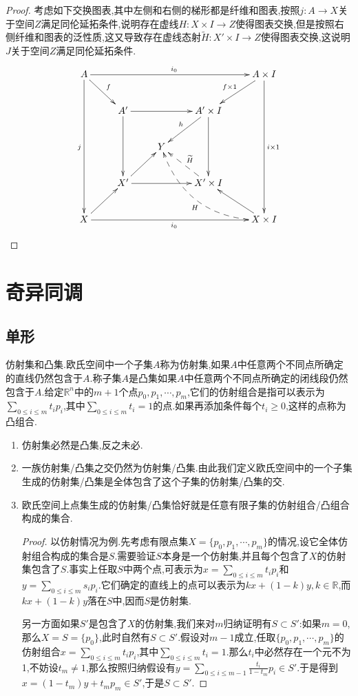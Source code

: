 \begin{enumerate}
\begin{proof}
    	考虑如下交换图表,其中左侧和右侧的梯形都是纤维和图表,按照$j:A\to X$关于空间$Z$满足同伦延拓条件,说明存在虚线$H:X\times I\to Z$使得图表交换,但是按照右侧纤维和图表的泛性质,这又导致存在虚线态射$\widetilde{H}:X'\times I\to Z$使得图表交换,这说明$J$关于空间$Z$满足同伦延拓条件.
    	$$\xymatrix{A\ar[rrrr]^{i_0}\ar[dddd]_j\ar[dr]^f&&&&A\times I\ar[dddd]^{i\times1}\ar[dl]_{f\times1}\\&A'\ar[rr]\ar[dd]&&A'\times I\ar[dd]\ar[dl]_h&\\&&Y&&\\&X'\ar[rr]\ar[ur]&&X'\times I\ar@{-->}[ul]_{\widetilde{H}}&\\X\ar[ur]\ar[rrrr]_{i_0}&&&&X\times I\ar[ul]\ar@/^2pc/@{-->}[uull]^{H}}$$
    \end{proof}
\end{enumerate}








\newpage
\section{奇异同调}
\subsection{单形}
	
仿射集和凸集.欧氏空间中一个子集$A$称为仿射集,如果$A$中任意两个不同点所确定的直线仍然包含于$A$.称子集$A$是凸集如果$A$中任意两个不同点所确定的闭线段仍然包含于$A$.给定$\mathbb{R}^n$中的$m+1$个点$p_0,p_1,\cdots,p_m$,它们的仿射组合是指可以表示为$\sum_{0\le i\le m}t_ip_i$,其中$\sum_{0\le i\le m}t_i=1$的点.如果再添加条件每个$t_i\ge0$,这样的点称为凸组合.
\begin{enumerate}
	\item 仿射集必然是凸集,反之未必.
	\item 一族仿射集/凸集之交仍然为仿射集/凸集.由此我们定义欧氏空间中的一个子集生成的仿射集/凸集是全体包含了这个子集的仿射集/凸集的交.
	\item 欧氏空间上点集生成的仿射集/凸集恰好就是任意有限子集的仿射组合/凸组合构成的集合.
	\begin{proof}
		
		以仿射情况为例.先考虑有限点集$X=\{p_0,p_1,\cdots,p_m\}$的情况,设它全体仿射组合构成的集合是$S$.需要验证$S$本身是一个仿射集,并且每个包含了$X$的仿射集包含了$S$.事实上任取$S$中两个点,可表示为$x=\sum_{0\le i\le m}t_ip_i$和$y=\sum_{0\le i\le m}s_ip_i$.它们确定的直线上的点可以表示为$kx+(1-k)y,k\in\mathbb{R}$,而$kx+(1-k)y$落在$S$中,因而$S$是仿射集.
		
		另一方面如果$S'$是包含了$X$的仿射集,我们来对$m$归纳证明有$S\subset S'$:如果$m=0$,那么$X=S=\{p_0\}$,此时自然有$S\subset S'$.假设对$m-1$成立,任取$\{p_0,p_1,\cdots,p_m\}$的仿射组合$x=\sum_{0\le i\le m}t_ip_i$,其中$\sum_{0\le i\le m}t_i=1$.那么$t_i$中必然存在一个元不为1,不妨设$t_m\not=1$,那么按照归纳假设有$y=\sum_{0\le i\le m-1}\frac{t_i}{1-t_m}p_i\in S'$.于是得到$x=(1-t_m)y+t_mp_m\in S'$,于是$S\subset S'$.
	\end{proof}
\end{enumerate}
	
